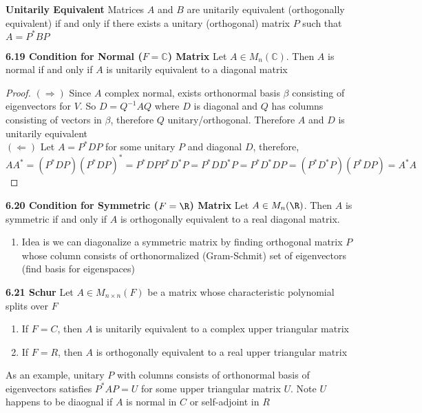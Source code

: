 \documentclass[11pt]{article}
\begin{document}
\begin{defn*}
    \textbf{Unitarily Equivalent} Matrices $A$ and $B$ are unitarily equivalent (orthogonally equivalent) if and only if there exists a unitary (orthogonal) matrix $P$ such that $A= P^* B P$
\end{defn*}

\begin{theorem*}
    \textbf{6.19 Condition for Normal ($F=\mathbb{C}$) Matrix} Let $A\in M_{n}(\mathbb{C})$. Then $A$ is normal if and only if $A$ is unitarily equivalent to a diagonal matrix
    \begin{proof}
        $(\Rightarrow)$ Since $A$ complex normal, exists orthonormal basis $\beta$ consisting of eigenvectors for $V$. So $D = Q^{-1}AQ$ where $D$ is diagonal and $Q$ has columns consisting of vectors in $\beta$, therefore $Q$ unitary/orthogonal. Therefore $A$ and $D$ is unitarily equivalent \\
        $(\Leftarrow)$ Let $A = P^*DP$ for some unitary $P$ and diagonal $D$, therefore, 
        \[
            AA^* = (P^*DP)(P^*DP)^* = P^*DPP^*D^*P = P^*DD^*P = P^*D^*DP = (P^*D^*P)(P^*DP) = A^*A
        \]
    \end{proof}
\end{theorem*}



\begin{theorem*}
    \textbf{6.20 Condition for Symmetric ($F=\R$) Matrix} Let $A \in M_{n}(\R)$. Then $A$ is symmetric if and only if $A$ is orthogonally equivalent to a real diagonal matrix.
    \begin{enumerate}
        \item Idea is we can diagonalize a symmetric matrix by finding orthogonal matrix $P$ whose column consists of orthonormalized (Gram-Schmit) set of eigenvectors (find basis for eigenspaces)
    \end{enumerate}
\end{theorem*}


\begin{theorem*}
    \textbf{6.21 Schur} Let $A\in M_{n\times n}(F)$ be a matrix whose characteristic polynomial splits over $F$ 
    \begin{enumerate}
        \item If $F=C$, then $A$ is unitarily equivalent to a complex upper triangular matrix 
        \item If $F=R$, then $A$ is orthogonally equivalent to a real upper triangular matrix
    \end{enumerate}
    As an example, unitary $P$ with columns consists of orthonormal basis of eigenvectors satisfies $P^*AP = U$ for some upper triangular matrix $U$. Note $U$ happens to be diaognal if $A$ is normal in $C$ or self-adjoint in $R$
\end{theorem*}
\end{document}
